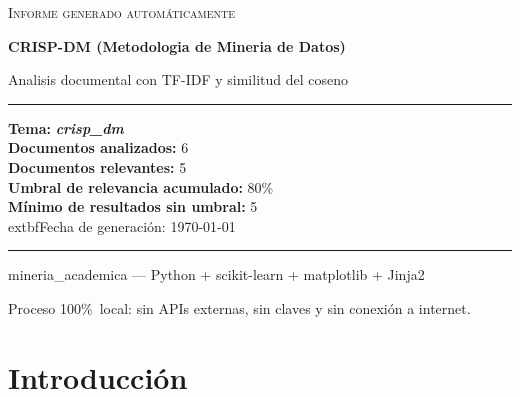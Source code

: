 \documentclass[11pt,a4paper]{article}
\newcommand{\tema}[1]{\textbf{\textit{#1}}}
\newcommand{\pcento}{\%}
\begin{document}
\begin{titlepage}
  \centering
  \vspace*{2.0cm}

  {\Large\textsc{Informe generado automáticamente}\par}
  \vspace{0.7cm}
  {\huge\bfseries CRISP-DM (Metodologia de Mineria de Datos)\par}
  \vspace{0.4cm}
  {\large Analisis documental con TF-IDF y similitud del coseno\par}

  \vspace{1.8cm}

  \begin{minipage}{0.92\textwidth}
    \hrule
    \vspace{0.4cm}
    {\small
    \textbf{Tema:} \tema{ crisp\_dm }\\[4pt]
    \textbf{Documentos analizados:} 6\\
    \textbf{Documentos relevantes:} 5\\
    \textbf{Umbral de relevancia acumulado:} 80\pcento\\
    \textbf{Mínimo de resultados sin umbral:} 5\\
      	extbf{Fecha de generación:} \today
    \par}
    \vspace{0.4cm}
    \hrule
  \end{minipage}

  \vfill

  {\small mineria\_academica --- Python + scikit-learn + matplotlib + Jinja2\par}
  {\footnotesize
   Proceso 100\pcento\ local: sin APIs externas, sin claves y sin conexión
   a internet.\par}
\end{titlepage}

\tableofcontents
\newpage

\section{Introducción}
\label{sec:introduccion}
\end{document}
